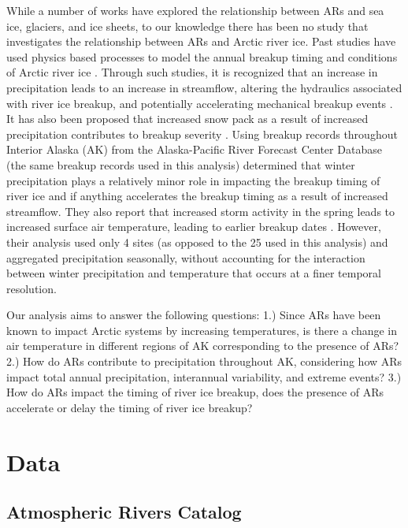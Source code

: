 \documentclass[12pts,draft]{AR_analysis_}
\begin{document}
While a number of works have explored
the relationship between ARs and sea ice, glaciers, and ice sheets, 
to our knowledge there has
been no study that investigates the relationship between ARs and Arctic
river ice. Past studies have used physics based processes
to model the annual breakup timing and conditions of Arctic river ice
\cite{Paily, ashton1986river, Prowse_Bonsal_Duguay_Lacroix_2007,
jasek1998, shen_newest}. Through such studies, it is recognized that an 
increase in precipitation leads to an increase in
streamflow, altering the hydraulics associated with river ice breakup, and 
potentially accelerating mechanical breakup events \cite{ashton1986river}.
It has also been proposed that increased snow pack as a result of increased 
precipitation contributes to breakup severity \cite{Prowes2002}. Using 
breakup records throughout Interior Alaska (AK) from the Alaska-Pacific 
River Forecast Center Database
(the same breakup records used in this analysis)  determined 
that winter precipitation plays a relatively minor role in impacting the 
breakup timing of river ice and if anything accelerates the breakup timing as a 
result of increased streamflow. They also report that 
increased storm activity in the spring leads to increased surface air 
temperature, leading to earlier breakup dates \cite{Bieniek2011}. However, 
their analysis used only 4 sites (as opposed to the 25 used in this analysis) 
and aggregated precipitation seasonally, without accounting for the interaction 
between winter precipitation and temperature that occurs at a finer temporal
resolution. 

Our analysis aims to answer the following questions: 
1.) Since ARs have been known to impact Arctic systems by increasing 
temperatures, is there a change in
air temperature in different regions of AK corresponding to the 
presence of ARs?
2.) How do ARs contribute to precipitation throughout AK, 
considering how ARs impact total annual precipitation, interannual 
variability, and extreme events?
3.) How do ARs impact the timing of river ice breakup, does the presence 
of ARs accelerate or delay the timing of river ice breakup?

\section{Data}

\subsection{Atmospheric Rivers Catalog}
\end{document}
